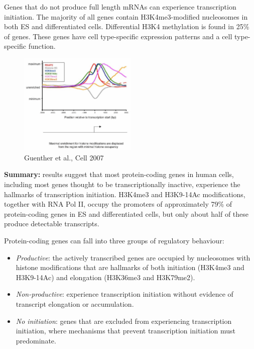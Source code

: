 Genes that do not produce full length mRNAs can experience transcription initiation. The majority of all genes contain H3K4me3-modified nucleosomes in both ES and differentiated cells. Differential H3K4 methylation is found in 25\% of genes. These genes have cell type-specific expression patterns and a cell type-specific function.

\begin{figure}
\centering
\includegraphics[width=0.5\textwidth]{../_resources/Screenshot_2022-09-22_at_21-49-05.png}
\caption{Guenther et al., Cell 2007}
\end{figure}

\textbf{Summary:} results suggest that most protein-coding genes in human cells, including most genes thought to be transcriptionally inactive, experience the hallmarks of transcription initiation. H3K4me3 and H3K9-14Ac modifications, together with RNA Pol II, occupy the promoters of approximately 79\% of protein-coding genes in ES and differentiated cells, but only about half of these produce detectable transcripts. 

Protein-coding genes can fall into three groups of regulatory behaviour:

\begin{itemize}
\tightlist
\item
  \emph{Productive}: the actively transcribed genes are occupied by nucleosomes with histone modifications that are hallmarks of both initiation (H3K4me3 and H3K9-14Ac) and elongation (H3K36me3 and H3K79me2).
\item
  \emph{Non-productive}: experience transcription initiation without evidence of transcript elongation or accumulation.
\item
  \emph{No initiation}: genes that are excluded from experiencing transcription initiation, where mechanisms that prevent transcription initiation must predominate.
\end{itemize}

